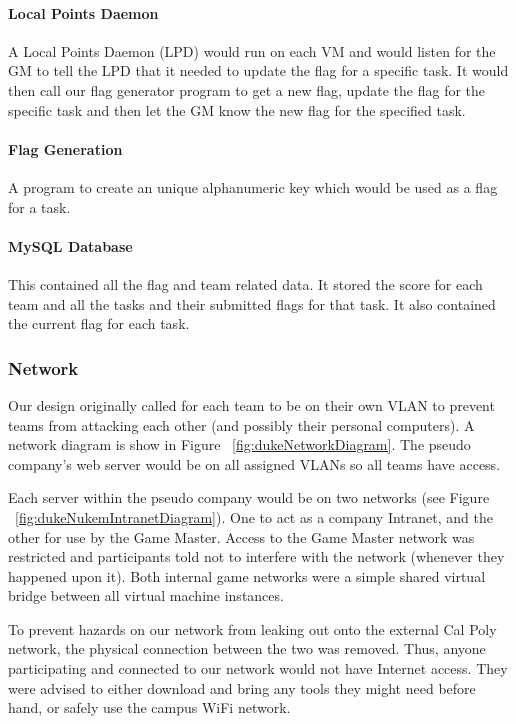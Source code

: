 \documentclass[10pt]{article}
\begin{document}
\paragraph*{Local Points Daemon}
A Local Points Daemon (LPD) would run on each VM and would listen for the GM
to tell the LPD that it needed to update the flag for a specific task. It would then call
our flag generator program to get a new flag, update the flag for the specific
task and then let the GM know the new flag for the specified task.

\paragraph*{Flag Generation}
A program to create an unique alphanumeric key which would be used as a flag
for a task.

\paragraph*{MySQL Database}
This contained all the flag and team related data. It stored the score for each team
and all the tasks and their submitted flags for that task. It also contained the current
flag for each task.


\subsubsection{Network}
Our design originally called for each team to be on their own VLAN to prevent
teams from attacking each other (and possibly their personal computers). A
network diagram is show in Figure ~\ref{fig:dukeNetworkDiagram}. The pseudo
company's web server would be on all assigned VLANs so all teams have access.

Each server within the pseudo company would be on two networks (see Figure
~\ref{fig:dukeNukemIntranetDiagram}). One to act as a company Intranet, and the
other for use by the Game Master. Access to the Game Master network was
restricted and participants told not to interfere with the network (whenever
they happened upon it). Both internal game networks were a simple shared virtual
bridge between all virtual machine instances.

To prevent hazards on our network from leaking out onto the external Cal Poly
network, the physical connection between the two was removed. Thus, anyone
participating and connected to our network would not have Internet access. They
were advised to either download and bring any tools they might need before hand,
or safely use the campus WiFi network.
\end{document}
